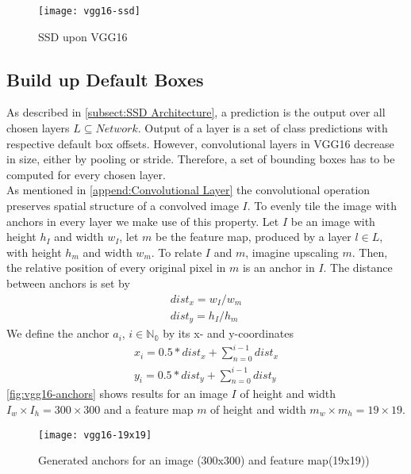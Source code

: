 
\begin{figure}[ht]
    \centering
    \texttt{[image: vgg16-ssd]}
    \caption{SSD upon VGG16}
    \label{fig:ssd-vgg}
\end{figure}

\subsection{Build up Default Boxes}\label{subsect:Build up Default Boxes}
As described in \autoref{subsect:SSD Architecture}, a prediction is the output 
over all chosen \glspl{layer} \(L\subseteq Network\). Output of a \gls{layer} is 
a set of class predictions with respective default box offsets. However, 
convolutional \glspl{layer} in VGG16 decrease in size, either by pooling or 
stride. Therefore, a set of bounding boxes has to be computed for every chosen 
\gls{layer}.\\

 
As mentioned in \autoref{append:Convolutional Layer} the convolutional 
operation preserves spatial structure of a convolved image \(I\). To evenly 
tile the image with \glspl{anchor} in every \gls{layer} we make use of this property. 
Let \(I\) be an image with height \(h_I\) and width \(w_I\), let \(m\) be the 
\gls{feature map}, produced by a \gls{layer} \(l\in L\), with height \(h_m\) and width \(w_m\). To relate \(I\) and \(m\), imagine upscaling \(m\). Then, 
the relative position of every original pixel in \(m\) is an \gls{anchor} in 
\(I\). The distance between
\glspl{anchor} is set by 
\begin{gather}
    dist_x=w_I/w_m\\
    dist_y=h_I/h_m
\end{gather}
We define the anchor \(a_i\), \(i\in \mathbb{N_0}\) by its x- and y-coordinates 
\begin{gather}
    x_i=0.5*dist_x + \sum_{n=0}^{i-1} dist_x\\
    y_i=0.5*dist_y + \sum_{n=0}^{i-1} dist_y
\end{gather}
\autoref{fig:vgg16-anchors} shows results for an image \(I\) of height and width \(I_w\times I_h=300\times 300\) and a \gls{feature map} \(m\) of height 
and width \(m_w\times m_h=19\times 19\).
\begin{figure}[ht]
    \centering
    \texttt{[image: vgg16-19x19]}
    \caption{Generated anchors for an image (300x300) and \gls{feature map}(19x19))}
    \label{fig:vgg16-anchors}
\end{figure}

